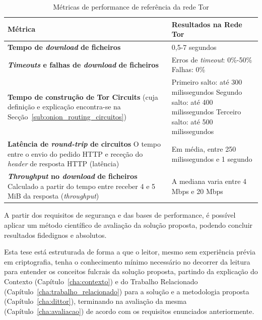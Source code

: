 \begin{table}[h]
  \centering
  \renewcommand{\arraystretch}{1.4}
  \begin{tabular}{|p{}|p{}|}
  \hline
  \textbf{Métrica} & \textbf{Resultados na Rede Tor} \\
  \hline
  \textbf{Tempo de \textit{download} de ficheiros} &
  0,5-7 segundos \\
  \hline
  \textbf{\textit{Timeouts} e falhas de \textit{download} de ficheiros} &
  Erros de \textit{timeout}: 0\%-50\% \newline
  Falhas: 0\% \\
  \hline
  \textbf{Tempo de construção de Tor Circuits} \newline
  (cuja definição e explicação encontra-se na Secção~\ref{sub:onion_routing_circuitos}) &
  Primeiro salto: até 300 milissegundos \newline
  Segundo salto: até 400 milissegundos \newline
  Terceiro salto: até 500 milissegundos \\
  \hline
  \textbf{Latência de \textit{round-trip} de circuitos} \newline
  O tempo entre o envio do pedido HTTP e receção do \textit{header} de resposta HTTP
  (latência) \cite{tormetrics} &
  Em média, entre 250 milissegundos e 1 segundo \\
  \hline
  \textbf{\textit{Throughput} no \textit{download} de ficheiros} \newline
  Calculado a partir do tempo entre receber 4 e 5 MiB da resposta
  (\textit{throughput}) \cite{tormetrics} &
  A mediana varia entre 4 Mbps e 20 Mbps \\
  \hline
  \end{tabular}
  \caption{Métricas de performance de referência da rede Tor}
  \label{tab:tor-metrics}
\end{table}

A partir dos requisitos de segurança e das bases de performance, é possível aplicar um método científico de avaliação da solução proposta, podendo concluir resultados fidedignos e absolutos.

Esta tese está estruturada de forma a que o leitor, mesmo sem experiência prévia em criptografia, tenha o conhecimento mínimo necessário no decorrer da leitura para entender os conceitos fulcrais da solução proposta, partindo da explicação do Contexto (Capítulo~\ref{cha:contexto}) e do Trabalho Relacionado (Capítulo~\ref{cha:trabalho_relacionado}) para a solução e a metodologia proposta (Capítulo~\ref{cha:dittor}), terminando na avaliação da mesma (Capítulo~\ref{cha:avaliacao}) de acordo com os requisitos enunciados anteriormente.